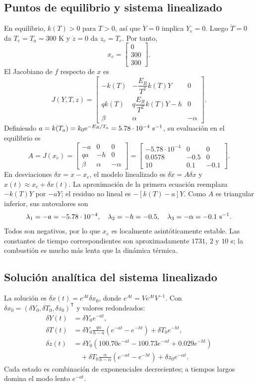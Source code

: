 \documentclass[11pt,a4paper]{article}
\newcommand{\e}{\mathrm{e}}
\begin{document}
\subsection{Puntos de equilibrio y sistema linealizado}
En equilibrio, $k(T)>0$ para $T>0$, así que $\dot Y=0$ implica $Y_e=0$. Luego $\dot T=0$ da $T_e=T_a=300$ K y $\dot z=0$ da $z_e=T_e$. Por tanto,
\[
x_e=\begin{bmatrix}0\\300\\300\end{bmatrix}.
\]
El Jacobiano de $f$ respecto de $x$ es
\begin{equation}
J(Y,T,z)=\begin{bmatrix}
-k(T)&-\dfrac{E_R}{T^2}k(T)Y&0\\
qk(T)&q\dfrac{E_R}{T^2}k(T)Y-h&0\\
\beta&\alpha&-\alpha
\end{bmatrix}.
\end{equation}
Definiendo $a=k(T_a)=k_0\e^{-E_R/T_a}=5.78\cdot10^{-4}\ {\rm s}^{-1}$, su evaluación en el equilibrio es
\[
A=J(x_e)=\begin{bmatrix}-a&0&0\\qa&-h&0\\\beta&\alpha&-\alpha\end{bmatrix}
=\begin{bmatrix}-5.78\cdot10^{-4}&0&0\\0.0578&-0.5&0\\10&0.1&-0.1\end{bmatrix}.
\]
En desviaciones $\delta x=x-x_e$, el modelo linealizado es $\delta\dot{x}=A\delta x$ y $x(t)\approx x_e+\delta x(t)$. La aproximación de la primera ecuación reemplaza $-k(T)Y$ por $-aY$; el residuo no lineal es $-[k(T)-a]Y$.
Como $A$ es triangular inferior, sus autovalores son
\[
\lambda_1=-a=-5.78\cdot10^{-4},\quad\lambda_2=-h=-0.5,\quad
\lambda_3=-\alpha=-0.1\ {\rm s}^{-1}.
\]
Todos son negativos, por lo que $x_e$ es localmente asintóticamente estable. Las constantes de tiempo correspondientes son aproximadamente $1731$, $2$ y $10$ s; la combustión es mucho más lenta que la dinámica térmica.
\subsection{Solución analítica del sistema linealizado}
La solución es $\delta x(t)=e^{At}\delta x_0$, donde $e^{At}=Ve^{\Lambda t}V^{-1}$. Con $\delta x_0=(\delta Y_0,\delta T_0,\delta z_0)^\mathsf{T}$ y valores redondeados:
\begin{align*}
\delta Y(t)&=\delta Y_0e^{-at},\\
\delta T(t)&=\delta Y_0\frac{qa}{h-a}(e^{-at}-e^{-ht})+\delta T_0e^{-ht},\\
\delta z(t)&=\delta Y_0(100.70e^{-at}-100.73e^{-\alpha t}+0.029e^{-ht})\\
&\quad+\delta T_0\frac{\alpha}{h-\alpha}(e^{-\alpha t}-e^{-ht})+\delta z_0e^{-\alpha t}.
\end{align*}
Cada estado es combinación de exponenciales decrecientes; a tiempos largos domina el modo lento $e^{-at}$.
\end{document}
